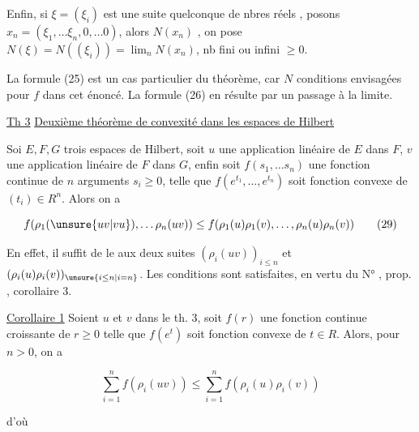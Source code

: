 
 Enfin, si $\xi=(\xi_i)$ est une suite quelconque de nbres réels , posons $x_n=(\xi_1,\ldots\xi_n,0,\ldots0)$, alors $N(x_n)$ ,  on pose $N(\xi)=N((\xi_i))=\lim_n N(x_n)$, nb fini ou infini $\geq0$.

 La formule (25) est un cas particulier du théorème, car $N$  conditions envisagées pour $f$ dans cet énoncé. La formule (26) en résulte par un passage à la limite.

\uline{Th 3} \uline{Deuxième théorème de convexité dans les espaces de Hilbert}

Soi $E,F,G$ trois espaces de Hilbert, soit $u$ une application linéaire  de $E$ dans $F$,  $v$ une application linéaire  de $F$ dans $G$,  enfin soit $f(s_1,\ldots s_n)$ une fonction continue  de $n$ arguments $s_i\geq0$, telle que  $f(e^{t_1},\ldots,e^{t_n})$ soit fonction convexe de $(t_i)\in R^n$. Alors on a

\[
f(\rho_1(\unsure{uv|vu}),\ldots\rho_n(uv))\leq f(\rho_1(u)\rho_1(v),\ldots,\rho_n(u)\rho_n(v))\tag*{(29)}
\]

En effet, il suffit de  le   aux deux suites $(\rho_i(uv))_{i\leq n}$ et $(\rho_i(u)\rho_i(v))_{\unsure{i\leq n|i=n}}$. Les conditions  sont satisfaites,  en vertu du N° , prop. , corollaire 3. 

\uline{Corollaire 1} Soient $u$ et $v$  dans le th. 3, soit $f(r)$ une fonction continue croissante de $r\geq0$ telle que $f(e^t)$ soit fonction convexe de $t\in R$. Alors, pour  $n>0$, on a

\[
\sum_{i=1}^n f(\rho_i(uv))\leq\sum_{i=1}^n f(\rho_i(u)\rho_i(v))\tag*{(30)}
\]

 d'où

